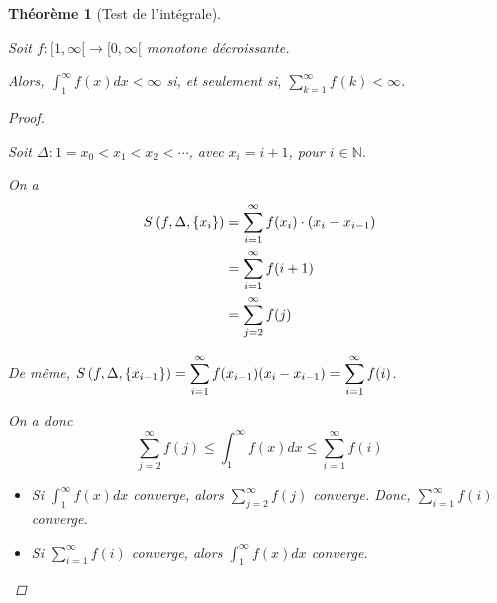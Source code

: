 \documentclass{report}
\newcommand*{\dsum}[4]{\displaystyle\sum_{#1=#2}^{#3}#4}
\newcommand*{\dint}[3]{\displaystyle\int_{#1}^{#2}#3}
\newcommand*{\lte}{\leqslant}
\newcommand*{\naturels}{\mathbb{N}}
\newtheorem*{thm}{Th\'eor\`eme}
\theoremstyle{definition}
\theoremstyle{remark}
\begin{document}
	\begin{thm}[Test de l'int\'egrale]~

		Soit $f: [1,\infty[ \to [0,\infty[$ monotone d\'ecroissante.

		Alors, $\dint{1}{\infty}{f(x)dx} < \infty$ si, et seulement si, $\dsum{k}{1}{\infty}{f(k)} < \infty$.
		\begin{proof}~

			Soit $\Delta: 1 = x_0 < x_1 < x_2 < \dotsb$, avec $x_i=i+1$, pour $i \in \naturels$.

			On a
			\begin{align*}
				\srie{f}[\Delta][\{x_i\}]&= \dsum{i}{1}{\infty}{f(x_i) \cdot (x_i-x_{i-1})}\\
				&= \dsum{i}{1}{\infty}{f(i+1)}\\
				&= \dsum{j}{2}{\infty}{f(j)}
			\end{align*}

			De m\^eme, $\srie{f}[\Delta][\{x_{i-1}\}] = \dsum{i}{1}{\infty}{f(x_{i-1})(x_i-x_{i-1})} = \dsum{i}{1}{\infty}{f(i)}$.

			On a donc
			\[
			\dsum{j}{2}{\infty}{f(j)} \lte \dint{1}{\infty}{f(x)dx} \lte \dsum{i}{1}{\infty}{f(i)}
			\]
			\begin{itemize}
			\item[$(\Rightarrow)$] Si $\dint{1}{\infty}{f(x)dx}$ converge, alors $\dsum{j}{2}{\infty}{f(j)}$ converge. Donc, $\dsum{i}{1}{\infty}{f(i)}$ converge.
			\item[$(\Leftarrow)$] Si $\dsum{i}{1}{\infty}{f(i)}$ converge, alors $\dint{1}{\infty}{f(x)dx}$ converge.
			\end{itemize}
		\end{proof}
	\end{thm}
\end{document}
